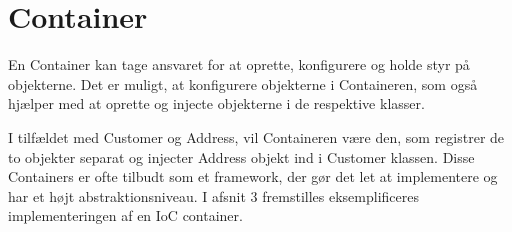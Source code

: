 \section{Container}

En Container kan tage ansvaret for at oprette, konfigurere og holde styr på objekterne. Det er muligt, at konfigurere objekterne i Containeren, som også hjælper med at oprette og injecte objekterne i de respektive klasser. 

I tilfældet med Customer og Address, vil Containeren være den, som registrer de to objekter separat og injecter Address objekt ind i Customer klassen. Disse Containers er ofte tilbudt som et framework, der gør det let at implementere og har et højt abstraktionsniveau. I afsnit 3 fremstilles eksemplificeres implementeringen af en IoC container.
